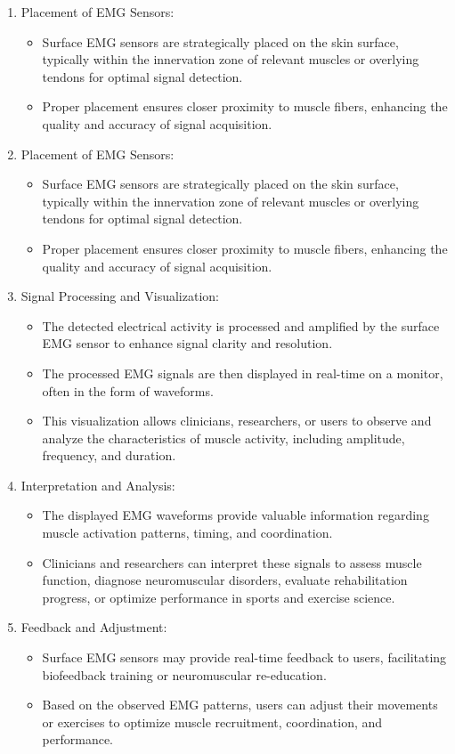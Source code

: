 \documentclass[ 12pt,a4paper,twocolumn,fleqn]{report}
\begin{document}
\begin{enumerate}
    \item Placement of EMG Sensors:
    \begin{itemize}
\item 	Surface EMG sensors are strategically placed on the skin surface, typically within the innervation zone of relevant muscles or overlying tendons for optimal signal detection.
\item 	Proper placement ensures closer proximity to muscle fibers, enhancing the quality and accuracy of signal acquisition.

\end{itemize}
\newpage
  \pagestyle{fancy}
\thisfancypage{%
  \setlength{\fboxsep}{20pt}\doublebox}{}
\normalsize
\item	Placement of EMG Sensors:
\begin{itemize}
\item	Surface EMG sensors are strategically placed on the skin surface, typically within the innervation zone of relevant muscles or overlying tendons for optimal signal detection.
\item	Proper placement ensures closer proximity to muscle fibers, enhancing the quality and accuracy of signal acquisition.
\end{itemize}
\item	Signal Processing and Visualization:
\begin{itemize}
\item	The detected electrical activity is processed and amplified by the surface EMG sensor to enhance signal clarity and resolution.
\item	The processed EMG signals are then displayed in real-time on a monitor, often in the form of waveforms.
\item	This visualization allows clinicians, researchers, or users to observe and analyze the characteristics of muscle activity, including amplitude, frequency, and duration.
\end{itemize}
\item	Interpretation and Analysis:
\begin{itemize}
\item	The displayed EMG waveforms provide valuable information regarding muscle activation patterns, timing, and coordination.
\item	Clinicians and researchers can interpret these signals to assess muscle function, diagnose neuromuscular disorders, evaluate rehabilitation progress, or optimize performance in sports and exercise science.
\end{itemize}
\item	Feedback and Adjustment:
\begin{itemize}
\item	Surface EMG sensors may provide real-time feedback to users, facilitating biofeedback training or neuromuscular re-education.
\item	Based on the observed EMG patterns, users can adjust their movements or exercises to optimize muscle recruitment, coordination, and performance.
\end{itemize}
\end{enumerate}
\end{document}
